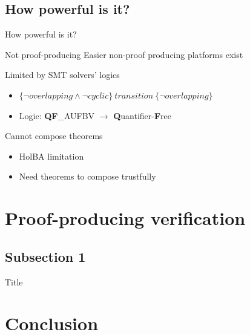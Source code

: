 \documentclass{beamer}
\newcommand{\htriple}[3]{\ensuremath{\{#1\}~#2~\{#3\}}}
\begin{document}
\subsection{How powerful is it?}

\begin{frame}{How powerful is it?}
    \begin{block}{Not proof-producing}
        Easier non-proof producing platforms exist
    \end{block}
    \pause
    \begin{block}{Limited by SMT solvers' logics}
        \begin{itemize}
            \item<3-> \htriple{\neg overlapping \land \neg cyclic}{transition}{\neg overlapping}
            \item<4-> Logic: \textbf{QF}\_AUFBV $\rightarrow$ \textbf{Q}uantifier-\textbf{F}ree
        \end{itemize}
    \end{block}
    \pause
    \begin{block}{Cannot compose theorems}
        \begin{itemize}
            \item<6-> HolBA limitation
            \item<7-> Need theorems to compose trustfully
        \end{itemize}
    \end{block}
\end{frame}

\section{Proof-producing verification}

\subsection{Subsection 1}

\begin{frame}{Title}
\end{frame}


\section{Conclusion}
\end{document}
